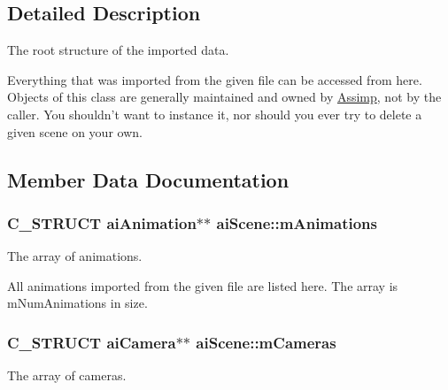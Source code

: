 \subsection{\-Detailed \-Description}
\-The root structure of the imported data.

\-Everything that was imported from the given file can be accessed from here. \-Objects of this class are generally maintained and owned by \hyperlink{namespaceAssimp}{\-Assimp}, not by the caller. \-You shouldn't want to instance it, nor should you ever try to delete a given scene on your own. 

\subsection{\-Member \-Data \-Documentation}
\hypertarget{structaiScene_ab76fb8f38c2e7365ccce42d565b62b25}{
\subsubsection[{m\-Animations}]{\setlength{\rightskip}{0pt plus 5cm}\-C\-\_\-\-S\-T\-R\-U\-C\-T {\bf ai\-Animation}$\ast$$\ast$ {\bf ai\-Scene\-::m\-Animations}}}\label{structaiScene_ab76fb8f38c2e7365ccce42d565b62b25}
\-The array of animations.

\-All animations imported from the given file are listed here. \-The array is m\-Num\-Animations in size. \hypertarget{structaiScene_a71e7d204d96969ca4f5a931f4d636f1e}{
\subsubsection[{m\-Cameras}]{\setlength{\rightskip}{0pt plus 5cm}\-C\-\_\-\-S\-T\-R\-U\-C\-T {\bf ai\-Camera}$\ast$$\ast$ {\bf ai\-Scene\-::m\-Cameras}}}\label{structaiScene_a71e7d204d96969ca4f5a931f4d636f1e}
\-The array of cameras.

